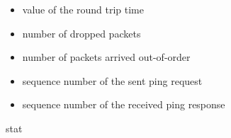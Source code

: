 \begin{itemize}
  \item {} value of the round trip time
  \item {} number of dropped packets
  \item {} number of packets arrived out-of-order
  \item {} sequence number of the sent ping request
  \item {} sequence number of the received ping response
\end{itemize}

 stat




